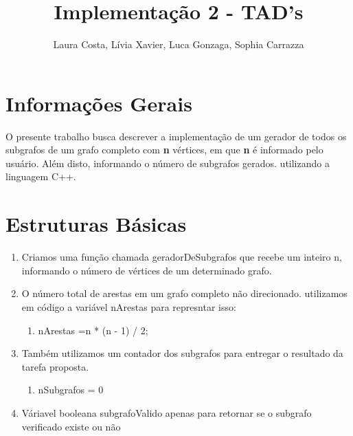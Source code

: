 \documentclass[12pt]{article}
\title{Implementação 2 - TAD's}
\author{Laura Costa\inst{1}, Lívia Xavier\inst{1}, Luca Gonzaga\inst{1}, Sophia Carrazza \inst{1} 
}
\begin{document}
 

\maketitle
\section{Informações Gerais}

O presente trabalho busca descrever a implementação de um gerador de todos os subgrafos de um grafo completo com \textbf{n} vértices, em que \textbf{n} é informado pelo usuário. Além disto, informando o número de subgrafos gerados.  utilizando a linguagem C++. 
\section{Estruturas Básicas}
\begin{enumerate}
    \item Criamos uma função chamada geradorDeSubgrafos que recebe um inteiro n, informando o número de vértices de um determinado grafo.
    \item O número total de arestas em um grafo completo não direcionado. utilizamos em código a variável nArestas para represntar isso: 
    \begin{enumerate}
        \item nArestas =n * (n - 1) / 2;
    \end{enumerate}
    \item Também utilizamos um contador dos subgrafos para entregar o resultado da tarefa proposta.
    \begin{enumerate}
        \item nSubgrafos = 0
    \end{enumerate}
\item  Váriavel booleana subgrafoValido apenas para retornar se o subgrafo verificado existe ou não
\end{enumerate}
\end{document}
